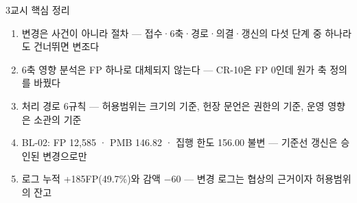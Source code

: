 \begin{frame}{3교시 핵심 정리}
\begin{enumerate}
\item 변경은 사건이 아니라 절차 — 접수·6축·경로·의결·갱신의 다섯 단계 중 하나라도 건너뛰면 변조다
\item 6축 영향 분석은 FP 하나로 대체되지 않는다 — CR-10은 FP 0인데 원가 축 정의를 바꿨다
\item 처리 경로 6규칙 — 허용범위는 크기의 기준, 헌장 문언은 권한의 기준, 운영 영향은 소관의 기준
\item BL-02: FP 12,585 · PMB 146.82 · 집행 한도 156.00 불변 — 기준선 갱신은 승인된 변경으로만
\item 로그 누적 +185FP(49.7\%)와 감액 $-$60 — 변경 로그는 협상의 근거이자 허용범위의 잔고
\end{enumerate}
\end{frame}
